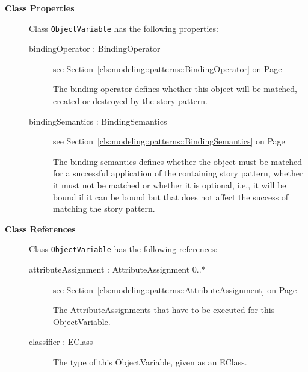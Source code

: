 \begin{description}

	\item[\textbf{Class Properties}] Class \texttt{ObjectVariable} has the following properties:
	\begin{description}
\item[bindingOperator : BindingOperator 	]
see Section~\ref{cls:modeling::patterns::BindingOperator} on Page~\pageref{cls:modeling::patterns::BindingOperator}
\hspace{\fill}
\nopagebreak


	
			
The binding operator defines whether this object will be matched, created or destroyed by the story pattern.	
		
	
\item[bindingSemantics : BindingSemantics 	]
see Section~\ref{cls:modeling::patterns::BindingSemantics} on Page~\pageref{cls:modeling::patterns::BindingSemantics}
\hspace{\fill}
\nopagebreak


	
			
The binding semantics defines whether the object must be matched for a successful application of the containing story pattern, whether it must not be matched or whether it is optional, i.e., it will be bound if it can be bound but that does not affect the success of matching the story pattern.	
		
	
	\end{description}
	
	\item[\textbf{Class References}] Class \texttt{ObjectVariable} has the following references:
	\begin{description}
\item[attributeAssignment : AttributeAssignment 			0..$*$]
see Section~\ref{cls:modeling::patterns::AttributeAssignment} on Page~\pageref{cls:modeling::patterns::AttributeAssignment}
\hspace{\fill}
\nopagebreak


	
			
The AttributeAssignments that have to be executed for this ObjectVariable.	
		
	
\item[classifier : EClass 	]

\hspace{\fill}
\nopagebreak


	
			
The type of this ObjectVariable, given as an EClass.	
			

\end{description}
\end{description}
